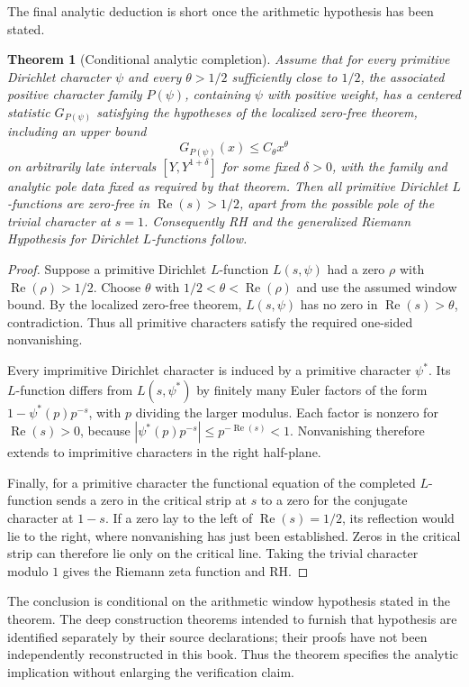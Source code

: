 \documentclass[11pt,openany,oneside]{scrbook}
\newtheorem{theorem}{Theorem}[chapter]
\theoremstyle{definition}
\theoremstyle{remark}
\newcommand{\Rea}{\operatorname{Re}}
\begin{document}
The final analytic deduction is short once the arithmetic hypothesis has been stated.
\begin{theorem}[Conditional analytic completion]\label{thm:conditional-completion}
Assume that for every primitive Dirichlet character $\psi$ and every $\theta>1/2$ sufficiently close to $1/2$, the associated positive character family $P(\psi)$, containing $\psi$ with positive weight, has a centered statistic $G_{P(\psi)}$ satisfying the hypotheses of the localized zero-free theorem, including an upper bound
\[
G_{P(\psi)}(x)\le C_\theta x^\theta
\]
on arbitrarily late intervals $[Y,Y^{1+\delta}]$ for some fixed $\delta>0$, with the family and analytic pole data fixed as required by that theorem. Then all primitive Dirichlet $L$-functions are zero-free in $\Rea(s)>1/2$, apart from the possible pole of the trivial character at $s=1$. Consequently RH and the generalized Riemann Hypothesis for Dirichlet $L$-functions follow.
\end{theorem}
\begin{proof}
Suppose a primitive Dirichlet $L$-function $L(s,\psi)$ had a zero $\rho$ with $\Rea(\rho)>1/2$. Choose $\theta$ with $1/2<\theta<\Rea(\rho)$ and use the assumed window bound. By the localized zero-free theorem, $L(s,\psi)$ has no zero in $\Rea(s)>\theta$, contradiction. Thus all primitive characters satisfy the required one-sided nonvanishing.

Every imprimitive Dirichlet character is induced by a primitive character $\psi^*$. Its $L$-function differs from $L(s,\psi^*)$ by finitely many Euler factors of the form $1-\psi^*(p)p^{-s}$, with $p$ dividing the larger modulus. Each factor is nonzero for $\Rea(s)>0$, because $|\psi^*(p)p^{-s}|\le p^{-\Rea(s)}<1$. Nonvanishing therefore extends to imprimitive characters in the right half-plane.

Finally, for a primitive character the functional equation of the completed $L$-function sends a zero in the critical strip at $s$ to a zero for the conjugate character at $1-s$. If a zero lay to the left of $\Rea(s)=1/2$, its reflection would lie to the right, where nonvanishing has just been established. Zeros in the critical strip can therefore lie only on the critical line. Taking the trivial character modulo $1$ gives the Riemann zeta function and RH.
\end{proof}

The conclusion is conditional on the arithmetic window hypothesis stated in the theorem. The deep construction theorems intended to furnish that hypothesis are identified separately by their source declarations; their proofs have not been independently reconstructed in this book. Thus the theorem specifies the analytic implication without enlarging the verification claim.
\end{document}
